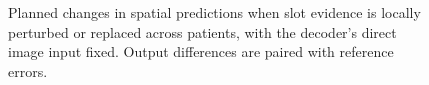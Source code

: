 \begin{figure}[tbp]
    \centering
    \caption{Planned changes in spatial predictions when slot evidence is locally perturbed or replaced across patients, with the decoder's direct image input fixed. Output differences are paired with reference errors.}
    \label{fig:candidate_slot_perturbation}
\end{figure}
